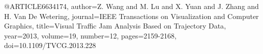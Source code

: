 @ARTICLE{6634174,
  author={Z. {Wang} and M. {Lu} and X. {Yuan} and J. {Zhang} and H. {Van De Wetering}},
  journal={IEEE Transactions on Visualization and Computer Graphics}, 
  title={Visual Traffic Jam Analysis Based on Trajectory Data}, 
  year={2013},
  volume={19},
  number={12},
  pages={2159-2168},
  doi={10.1109/TVCG.2013.228}}